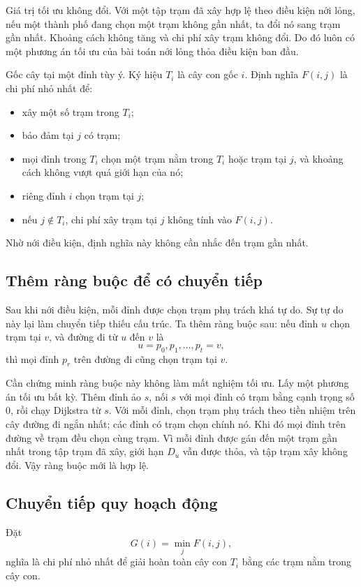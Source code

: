 \documentclass[11pt]{article}
\begin{document}
Giá trị tối ưu không đổi. Với một tập trạm đã xây hợp lệ theo điều kiện nới
lỏng, nếu một thành phố đang chọn một trạm không gần nhất, ta đổi nó sang trạm
gần nhất. Khoảng cách không tăng và chi phí xây trạm không đổi. Do đó luôn có
một phương án tối ưu của bài toán nới lỏng thỏa điều kiện ban đầu.

Gốc cây tại một đỉnh tùy ý. Ký hiệu \(T_i\) là cây con gốc \(i\). Định nghĩa
\(F(i,j)\) là chi phí nhỏ nhất để:
\begin{itemize}
  \item xây một số trạm trong \(T_i\);
  \item bảo đảm tại \(j\) có trạm;
  \item mọi đỉnh trong \(T_i\) chọn một trạm nằm trong \(T_i\) hoặc trạm tại
  \(j\), và khoảng cách không vượt quá giới hạn của nó;
  \item riêng đỉnh \(i\) chọn trạm tại \(j\);
  \item nếu \(j\notin T_i\), chi phí xây trạm tại \(j\) không tính vào
  \(F(i,j)\).
\end{itemize}
Nhờ nới điều kiện, định nghĩa này không cần nhắc đến trạm gần nhất.

\subsection{Thêm ràng buộc để có chuyển tiếp}

Sau khi nới điều kiện, mỗi đỉnh được chọn trạm phụ trách khá tự do. Sự tự do
này lại làm chuyển tiếp thiếu cấu trúc. Ta thêm ràng buộc sau: nếu đỉnh \(u\)
chọn trạm tại \(v\), và đường đi từ \(u\) đến \(v\) là
\[
  u=p_0,p_1,\ldots,p_t=v,
\]
thì mọi đỉnh \(p_r\) trên đường đi cũng chọn trạm tại \(v\).

Cần chứng minh ràng buộc này không làm mất nghiệm tối ưu. Lấy một phương án
tối ưu bất kỳ. Thêm đỉnh ảo \(s\), nối \(s\) với mọi đỉnh có trạm bằng cạnh
trọng số \(0\), rồi chạy Dijkstra từ \(s\). Với mỗi đỉnh, chọn trạm phụ trách
theo tiền nhiệm trên cây đường đi ngắn nhất; các đỉnh có trạm chọn chính nó.
Khi đó mọi đỉnh trên đường về trạm đều chọn cùng trạm. Vì mỗi đỉnh được gán
đến một trạm gần nhất trong tập trạm đã xây, giới hạn \(D_u\) vẫn được thỏa,
và tập trạm xây không đổi. Vậy ràng buộc mới là hợp lệ.

\subsection{Chuyển tiếp quy hoạch động}

Đặt
\[
  G(i)=\min_j F(i,j),
\]
nghĩa là chi phí nhỏ nhất để giải hoàn toàn cây con \(T_i\) bằng các trạm nằm
trong cây con.
\end{document}
